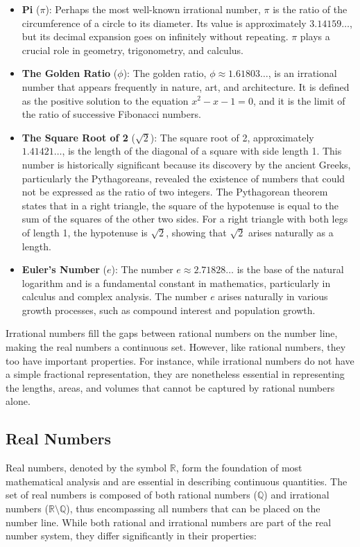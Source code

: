 \begin{itemize}
    \item \textbf{Pi} ($\pi$): Perhaps the most well-known irrational number, $\pi$ is the ratio of the circumference of a circle to its diameter. Its value is approximately $3.14159\ldots$, but its decimal expansion goes on infinitely without repeating. $\pi$ plays a crucial role in geometry, trigonometry, and calculus.

    \item \textbf{The Golden Ratio} ($\phi$): The golden ratio, $\phi \approx 1.61803\ldots$, is an irrational number that appears frequently in nature, art, and architecture. It is defined as the positive solution to the equation $x^2 - x - 1 = 0$, and it is the limit of the ratio of successive Fibonacci numbers.

    \item \textbf{The Square Root of 2} ($\sqrt{2}$): The square root of 2, approximately $1.41421\ldots$, is the length of the diagonal of a square with side length 1. This number is historically significant because its discovery by the ancient Greeks, particularly the Pythagoreans, revealed the existence of numbers that could not be expressed as the ratio of two integers. The Pythagorean theorem states that in a right triangle, the square of the hypotenuse is equal to the sum of the squares of the other two sides. For a right triangle with both legs of length 1, the hypotenuse is $\sqrt{2}$, showing that $\sqrt{2}$ arises naturally as a length.

    \item \textbf{Euler's Number} ($e$): The number $e \approx 2.71828\ldots$ is the base of the natural logarithm and is a fundamental constant in mathematics, particularly in calculus and complex analysis. The number $e$ arises naturally in various growth processes, such as compound interest and population growth.
\end{itemize}

Irrational numbers fill the gaps between rational numbers on the number line, making the real numbers a continuous set. However, like rational numbers, they too have important properties. For instance, while irrational numbers do not have a simple fractional representation, they are nonetheless essential in representing the lengths, areas, and volumes that cannot be captured by rational numbers alone.

\subsection*{Real Numbers}
Real numbers, denoted by the symbol $\mathbb{R}$, form the foundation of most mathematical analysis and are essential in describing continuous quantities. The set of real numbers is composed of both rational numbers ($\mathbb{Q}$) and irrational numbers ($\mathbb{R} \setminus \mathbb{Q}$), thus encompassing all numbers that can be placed on the number line. While both rational and irrational numbers are part of the real number system, they differ significantly in their properties:

